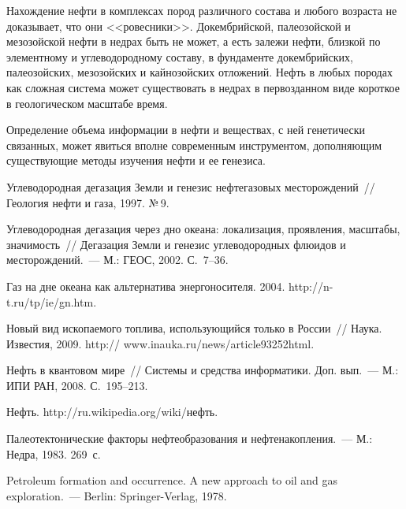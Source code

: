 \begin{multicols}{2}
     Нахождение нефти в комплексах пород различного состава и любого возраста 
не доказывает, что они <<ровесники>>. Докембрийской, палеозойской и 
мезозойской нефти в недрах быть не может, а есть залежи нефти, близкой по 
элементному и углеводородному составу, в фундаменте докембрийских, 
палеозойских, мезозойских и кайнозойских отложений. Нефть в любых породах 
как сложная сис\-те\-ма может существовать в недрах в первозданном виде короткое в 
геологическом масштабе время.
     
     Определение объема информации в нефти и веществах, с ней генетически 
связанных, может явиться вполне современным инструментом, дополняющим 
существующие методы изучения нефти и ее генезиса.

{\small\frenchspacing
{%
\begin{thebibliography}{99}     

Углеводородная дегазация Земли и генезис нефтегазовых месторождений~// 
Геология нефти и газа, 1997. №\,9.

Углеводородная дегазация через дно океана: локализация, проявления, масштабы, 
значимость~// Дегазация Земли и генезис углеводородных флюидов и 
месторождений.~--- М.: ГЕОС, 2002. С.~7--36.

Газ на дне океана как альтернатива энергоносителя. 2004. {\sf http://n-t.ru/tp/ie/gn.htm}.

Новый вид ископаемого топлива, использующийся только в России~// Наука. 
Известия, 2009. {\sf  http:// www.inauka.ru/news/article93252html}.

Нефть в квантовом мире~// Системы и средства информатики. Доп. вып.~--- М.: 
ИПИ РАН, 2008. С.~195--213.

Нефть. {\sf http://ru.wikipedia.org/wiki/нефть}.


Палеотектонические факторы нефтеобразования и нефтенакопления.~--- М.: Недра, 
1983.  269~с.

Petroleum formation and occurrence. A new approach to oil and gas exploration.~--- 
Berlin: Springer-Verlag, 1978. 
     

\end{thebibliography}}}
\end{multicols}
